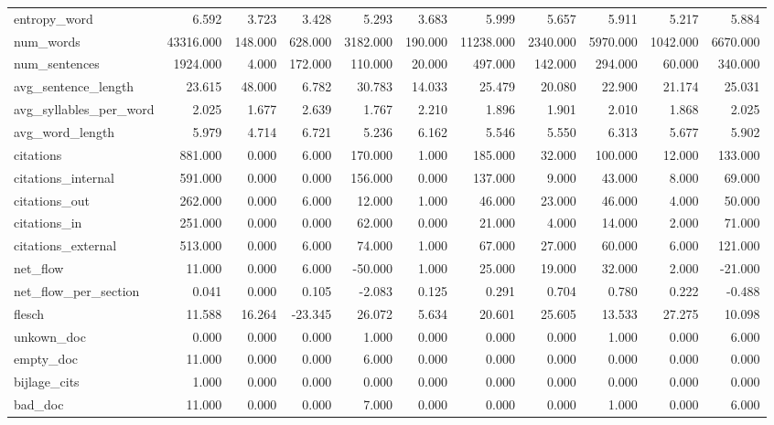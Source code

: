 \begin{tabular}{lrrrrrrrrrr}
\cline{1-11}
entropy\_word & 6.592 & 3.723 & 3.428 & 5.293 & 3.683 & 5.999 & 5.657 & 5.911 & 5.217 & 5.884 \\
\cline{1-11}
num\_words & 43316.000 & 148.000 & 628.000 & 3182.000 & 190.000 & 11238.000 & 2340.000 & 5970.000 & 1042.000 & 6670.000 \\
\cline{1-11}
num\_sentences & 1924.000 & 4.000 & 172.000 & 110.000 & 20.000 & 497.000 & 142.000 & 294.000 & 60.000 & 340.000 \\
\cline{1-11}
avg\_sentence\_length & 23.615 & 48.000 & 6.782 & 30.783 & 14.033 & 25.479 & 20.080 & 22.900 & 21.174 & 25.031 \\
\cline{1-11}
avg\_syllables\_per\_word & 2.025 & 1.677 & 2.639 & 1.767 & 2.210 & 1.896 & 1.901 & 2.010 & 1.868 & 2.025 \\
\cline{1-11}
avg\_word\_length & 5.979 & 4.714 & 6.721 & 5.236 & 6.162 & 5.546 & 5.550 & 6.313 & 5.677 & 5.902 \\
\cline{1-11}
citations & 881.000 & 0.000 & 6.000 & 170.000 & 1.000 & 185.000 & 32.000 & 100.000 & 12.000 & 133.000 \\
\cline{1-11}
citations\_internal & 591.000 & 0.000 & 0.000 & 156.000 & 0.000 & 137.000 & 9.000 & 43.000 & 8.000 & 69.000 \\
\cline{1-11}
citations\_out & 262.000 & 0.000 & 6.000 & 12.000 & 1.000 & 46.000 & 23.000 & 46.000 & 4.000 & 50.000 \\
\cline{1-11}
citations\_in & 251.000 & 0.000 & 0.000 & 62.000 & 0.000 & 21.000 & 4.000 & 14.000 & 2.000 & 71.000 \\
\cline{1-11}
citations\_external & 513.000 & 0.000 & 6.000 & 74.000 & 1.000 & 67.000 & 27.000 & 60.000 & 6.000 & 121.000 \\
\cline{1-11}
net\_flow & 11.000 & 0.000 & 6.000 & -50.000 & 1.000 & 25.000 & 19.000 & 32.000 & 2.000 & -21.000 \\
\cline{1-11}
net\_flow\_per\_section & 0.041 & 0.000 & 0.105 & -2.083 & 0.125 & 0.291 & 0.704 & 0.780 & 0.222 & -0.488 \\
\cline{1-11}
flesch & 11.588 & 16.264 & -23.345 & 26.072 & 5.634 & 20.601 & 25.605 & 13.533 & 27.275 & 10.098 \\
\cline{1-11}
unkown\_doc & 0.000 & 0.000 & 0.000 & 1.000 & 0.000 & 0.000 & 0.000 & 1.000 & 0.000 & 6.000 \\
\cline{1-11}
empty\_doc & 11.000 & 0.000 & 0.000 & 6.000 & 0.000 & 0.000 & 0.000 & 0.000 & 0.000 & 0.000 \\
\cline{1-11}
bijlage\_cits & 1.000 & 0.000 & 0.000 & 0.000 & 0.000 & 0.000 & 0.000 & 0.000 & 0.000 & 0.000 \\
\cline{1-11}
bad\_doc & 11.000 & 0.000 & 0.000 & 7.000 & 0.000 & 0.000 & 0.000 & 1.000 & 0.000 & 6.000 \\
\cline{1-11}
\bottomrule
\end{tabular}
